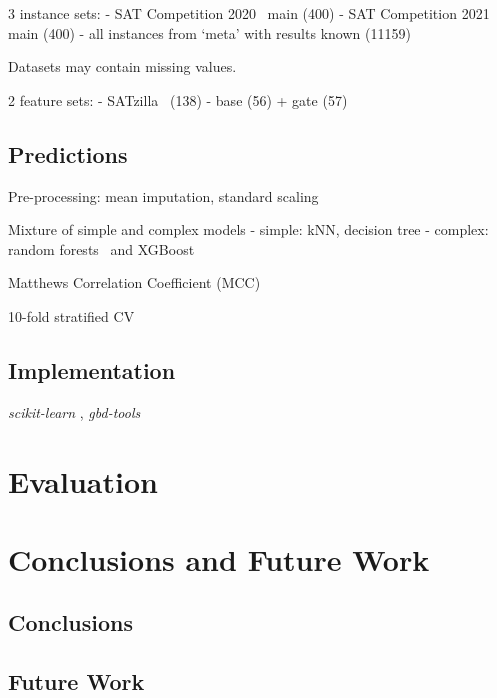\documentclass{article}
\begin{document}
3 instance sets:
- SAT Competition 2020~\cite{balyo2020proceedings} main (400)
- SAT Competition 2021~\cite{balyo2021proceedings} main (400)
- all instances from `meta' with results known (11159)

Datasets may contain missing values.

2 feature sets:
- SATzilla~\cite{xu2012features} (138)
- base (56) + gate (57)

\subsection{Predictions}

Pre-processing: mean imputation, standard scaling

Mixture of simple and complex models
- simple: kNN, decision tree
- complex: random forests~\cite{breiman2001random} and XGBoost~\cite{chen2016xgboost}

Matthews Correlation Coefficient (MCC)~\cite{matthews1975comparison, gorodkin2004comparing}

10-fold stratified CV

\subsection{Implementation}

\emph{scikit-learn} \cite{pedregosa2011scikit}, \emph{gbd-tools}~\cite{iser2020collaborative}

\section{Evaluation}
\label{sec:evaluation}

\section{Conclusions and Future Work}
\label{sec:conclusion}

\subsection{Conclusions}

\subsection{Future Work}

\printbibliography
\end{document}
